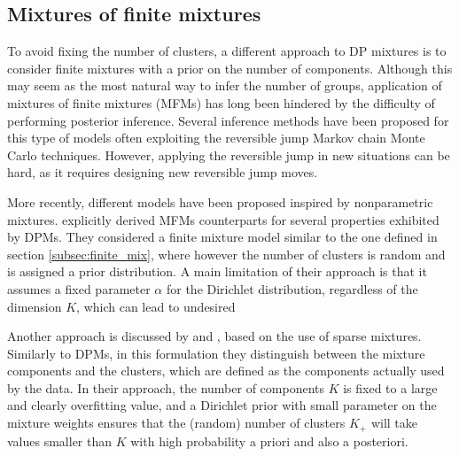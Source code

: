 \subsection{Mixtures of finite mixtures}
To avoid fixing the number of clusters, a different approach to DP mixtures is to consider finite mixtures with a prior on the number of components. Although this may seem as the most natural way to infer the number of groups, application of mixtures of finite mixtures (MFMs) has long been hindered by the difficulty of performing posterior inference. 
Several inference methods have been proposed for this type of models \citep{McCullagh2008,nobile2004,nobile2007,richardson1997} often exploiting the reversible jump Markov chain Monte Carlo techniques. However, applying the reversible jump in new situations can be hard, as it requires designing new reversible jump moves.

More recently, different models have been proposed inspired by nonparametric mixtures. \citet{miller2018} explicitly derived MFMs counterparts for several properties exhibited by DPMs. They considered a finite mixture model similar to the one defined in section \ref{subsec:finite_mix}, where however the number of clusters is random and is assigned a prior distribution. A main limitation of their approach is that it assumes a fixed parameter $\alpha$ for the Dirichlet distribution, regardless of the dimension $K$, which can lead to undesired 

Another approach is discussed by \citet{malsinerwalli2016} and \cite{fs2019}, based on the use of sparse mixtures. Similarly to DPMs, in this formulation they distinguish between the mixture components and the clusters, which are defined as the components actually used by the data. In their approach, the number of components $K$ is fixed to a large and clearly overfitting value, and a Dirichlet prior with small parameter on the mixture weights ensures that the (random) number of clusters $K_+$ will take values smaller than $K$ with high probability a priori and also a posteriori.

